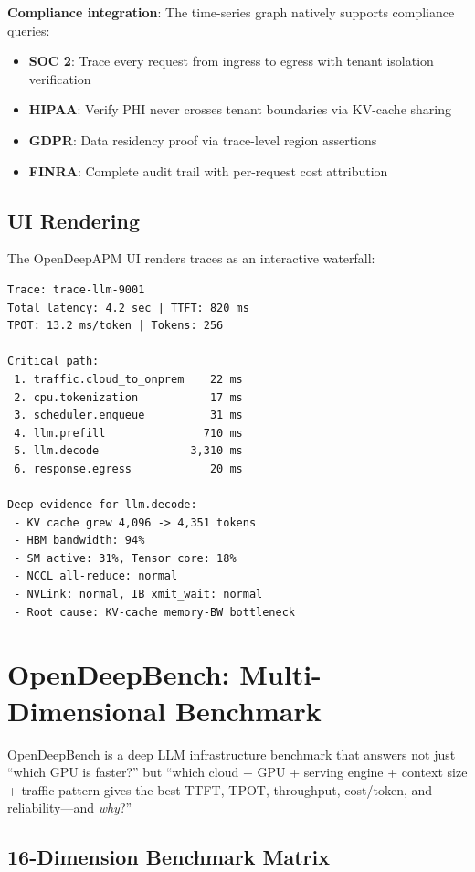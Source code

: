 \documentclass[conference,10pt]{IEEEtran}
\begin{document}
\textbf{Compliance integration}: The time-series graph natively supports compliance queries:
\begin{itemize}
\item \textbf{SOC 2}: Trace every request from ingress to egress with tenant isolation verification
\item \textbf{HIPAA}: Verify PHI never crosses tenant boundaries via KV-cache sharing
\item \textbf{GDPR}: Data residency proof via trace-level region assertions
\item \textbf{FINRA}: Complete audit trail with per-request cost attribution
\end{itemize}

\subsection{UI Rendering}

The OpenDeepAPM UI renders traces as an interactive waterfall:

\begin{lstlisting}
Trace: trace-llm-9001
Total latency: 4.2 sec | TTFT: 820 ms
TPOT: 13.2 ms/token | Tokens: 256

Critical path:
 1. traffic.cloud_to_onprem    22 ms
 2. cpu.tokenization           17 ms
 3. scheduler.enqueue          31 ms
 4. llm.prefill               710 ms
 5. llm.decode              3,310 ms
 6. response.egress            20 ms

Deep evidence for llm.decode:
 - KV cache grew 4,096 -> 4,351 tokens
 - HBM bandwidth: 94%
 - SM active: 31%, Tensor core: 18%
 - NCCL all-reduce: normal
 - NVLink: normal, IB xmit_wait: normal
 - Root cause: KV-cache memory-BW bottleneck
\end{lstlisting}

\section{OpenDeepBench: Multi-Dimensional Benchmark}
\label{sec:deepbench}

OpenDeepBench is a deep LLM infrastructure benchmark that answers not just ``which GPU is faster?'' but ``which cloud + GPU + serving engine + context size + traffic pattern gives the best TTFT, TPOT, throughput, cost/token, and reliability---and \emph{why}?''

\subsection{16-Dimension Benchmark Matrix}
\end{document}

